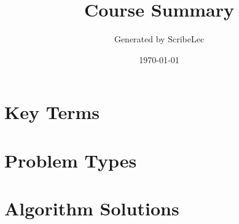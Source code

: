 \documentclass{article}%
\title{Course Summary}%
\author{Generated by ScribeLec}%
\date{\today}%
\begin{document}
%
\normalsize%
\maketitle%
\tableofcontents\newpage%
\section{Key Terms}%
\label{sec:KeyTerms}%
\newpage

%
\section{Problem Types}%
\label{sec:ProblemTypes}%
\newpage

%
\section{Algorithm Solutions}%
\label{sec:AlgorithmSolutions}%
\newpage

%
\end{document}
